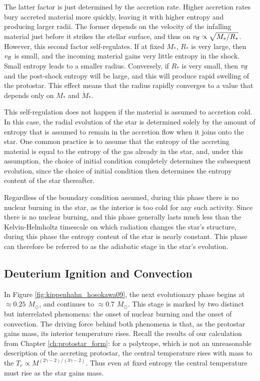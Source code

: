 The latter factor is just determined by the accretion rate. Higher accretion rates bury accreted material more quickly, leaving it with higher entropy and producing larger radii. The former depends on the velocity of the infalling material just before it strikes the stellar surface, and thus on $v_{\rm ff}\propto \sqrt{M_*/R_*}$. However, this second factor self-regulates. If at fixed $M_*$, $R_*$ is very large, then $v_{\rm ff}$ is small, and the incoming material gains very little entropy in the shock. Small entropy leads to a smaller radius. Conversely, if $R_*$ is very small, then $v_{\rm ff}$ and the post-shock entropy will be large, and this will produce rapid swelling of the protostar. This effect means that the radius rapidly converges to a value that depends only on $M_*$ and $\dot{M}_*$.

This self-regulation does not happen if the material is assumed to accretion cold. In this case, the radial evolution of the star is determined solely by the amount of entropy that is assumed to remain in the accretion flow when it joins onto the star. One common practice is to assume that the entropy of the accreting material is equal to the entropy of the gas already in the star, and, under this assumption, the choice of initial condition completely determines the subsequent evolution, since the choice of initial condition then determines the entropy content of the star thereafter.

Regardless of the boundary condition assumed, during this phase there is no nuclear burning in the star, as the interior is too cold for any such activity. Since there is no nuclear burning, and this phase generally lasts much less than the Kelvin-Helmholtz timescale on which radiation changes the star's structure, during this phase the entropy content of the star is nearly constant. This phase can therefore be referred to as the adiabatic stage in the star's evolution.


\subsection{Deuterium Ignition and Convection}

In Figure \ref{fig:kippenhahn_hosokawa09}, the next evolutionary phase begins at $\approx 0.25$ $M_\odot$, and continues to $\approx 0.7$ $M_\odot$. This stage is marked by two distinct but interrelated phenomena: the onset of nuclear burning and the onset of convection. The driving force behind both phenomena is that, as the protostar gains mass, its interior temperature rises. Recall the results of our calculation from Chapter \ref{ch:protostar_form}: for a polytrope, which is not an unreasonable description of the accreting protostar, the central temperature rises with mass to the $T_c\propto M^{(2\gamma-2)/(3\gamma-2)}$. Thus even at fixed entropy the central temperature must rise as the star gains mass.

